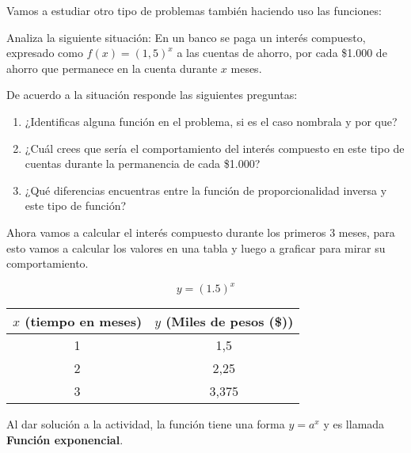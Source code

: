 \documentclass[12pt,a4paper]{article}
\begin{document}
\vspace{1cm}

Vamos a estudiar otro tipo de problemas también haciendo uso las funciones:

Analiza la siguiente situación: En un banco se paga un interés compuesto, expresado como $f(x) = (1,5)^x$ a las cuentas de ahorro, por cada \$1.000 de ahorro que permanece en la cuenta durante $x$ meses.

De acuerdo a la situación responde las siguientes preguntas:

\begin{enumerate}
\item ¿Identificas alguna función en el problema, si es el caso nombrala y por que?
\item ¿Cuál crees que sería el comportamiento del interés compuesto en este tipo de cuentas durante la permanencia de cada \$1.000?
\item ¿Qué diferencias encuentras entre la función de proporcionalidad inversa y este tipo de función?
\end{enumerate}

Ahora vamos a calcular el interés compuesto durante los primeros 3 meses, para esto vamos a calcular los valores en una tabla y luego a graficar para mirar su comportamiento.

$$y = (1.5)^x$$

\begin{center}
\begin{tabular}{|c|c|}
\hline
$x$ (tiempo en meses) & $y$ (Miles de pesos (\$)) \\
\hline
1 & 1,5 \\
2 & 2,25 \\
3 & 3,375 \\
\hline
\end{tabular}
\end{center}

Al dar solución a la actividad, la función tiene una forma $y = a^x$ y es llamada \textbf{Función exponencial}.

\begin{center}
\end{center}
\end{document}
